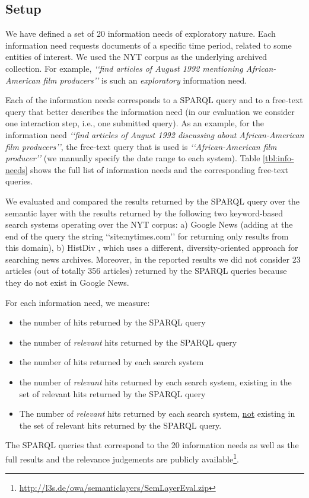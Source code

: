 \documentclass[twocolumn]{svjour3}
\newcommand{\q}[1]{\lq\lq{}{}#1\rq\rq{}{}}
\begin{document}
\subsection{Setup}
We have defined a set of 20 information needs of
exploratory nature.
Each information need requests documents
of a specific time period, related to some entities of interest.
We used the NYT corpus as the underlying archived collection.
For example, {\em \q{find articles of August 1992 mentioning African-American film producers}}
is such an {\em exploratory} information need.

Each of the information needs corresponds to a SPARQL query
and to a free-text query that better describes the information need
(in our evaluation we consider one interaction step,
i.e., one submitted query).
As an example, for the information need
{\em \q{find articles of August 1992 discussing about African-American film producers}},
the free-text query that is used is {\em \q{African-American film producer}}
(we manually specify the date range to each system).
Table \ref{tbl:info-needs} shows the full list of information needs and the corresponding free-text queries.

We evaluated and compared the results returned by the SPARQL query over the semantic layer
with the results returned by the following two keyword-based search systems operating over the NYT corpus:
a) Google News (adding at the end of the query the string \q{site:nytimes.com} for
returning only results from this domain),
b) HistDiv \cite{singh2016history}, which uses a different, diversity-oriented approach
for searching news archives.
Moreover, in the reported results we did not
consider 23 articles (out of totally 356 articles)
returned by the SPARQL queries because they do not
exist in Google News.

For each information need, we measure:
\begin{itemize}
\item  the number of hits returned by the SPARQL query
\item  the number of {\em relevant} hits returned by the SPARQL query
\item  the number of hits returned by each search system
\item  the number of {\em relevant} hits returned by each search
        system, existing in the set of relevant hits returned by the SPARQL query
\item The number of {\em relevant} hits returned by each search system, \underline{not}
existing in the set of relevant hits returned by the SPARQL query.
\end{itemize}
The SPARQL queries that correspond to the 20 information needs
as well as the full results and the relevance judgements are publicly
available\footnote{\url{http://l3s.de/owa/semanticlayers/SemLayerEval.zip}}.
\end{document}
